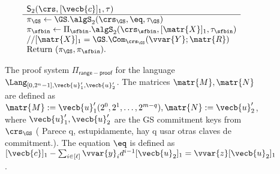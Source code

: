 \begin{figure}
$$\begin{array}{ll}
\begin{array}{l}
{\mathsf{S}_2(\crs,[\vecb{c}]_1,\tau)}\\
\hline
\pi_\GS\gets \GS.\algS_2(\crs_\GS,\eq,\tau_\GS)\\
\pi_\sfbin\gets \Pi_\sfbin.\algS_2(\crs_\sfbin,[\matr{X}]_1,\tau_\sfbin)\\
//{[\matr{X}]_1=\GS.\Com_{\crs_\GS}(\vvar{Y};\matr{R})}\\
\text{Return }  (\pi_\GS,\pi_\sfbin).
\end{array}
\end{array}$$
\caption{The proof system $\Pi_\mathsf{range-proof}$ for the language $\Lang_{[0,2^n-1],\vecb{u}'_1,\vecb{u}'_2}$. The matrices $\matr{M},\matr{N}$ are defined as $\matr{M}:=\vecb{u}'_1(2^0,2^1,\ldots,2^{m-q}),\matr{N}:=\vecb{u}'_2$, where $\vecb{u}'_1,\vecb{u}'_2$ are the GS commitment keys from $\crs_\GS$ ({\color{red} Parece q, estupidamente, hay q usar otras claves de commitment.}). The equation $\eq$ is defined as $[\vecb{c}]_1-\sum_{i\in[\ell]}\vvar{y}_id^{i-1}[\vecb{u}_2]_1=\vvar{z}[\vecb{u}_2]_1$.
\label{fig:rp}}
\end{figure}

